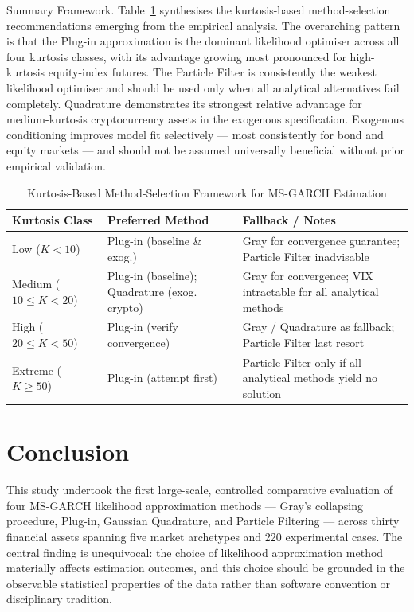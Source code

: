\documentclass[12pt, a4paper]{article}
\begin{document}
Summary Framework.
Table~\ref{tab:framework} synthesises the kurtosis-based method-selection recommendations emerging from the empirical analysis. The overarching pattern is that the Plug-in approximation is the dominant likelihood optimiser across all four kurtosis classes, with its advantage growing most pronounced for high-kurtosis equity-index futures. The Particle Filter is consistently the weakest likelihood optimiser and should be used only when all analytical alternatives fail completely. Quadrature demonstrates its strongest relative advantage for medium-kurtosis cryptocurrency assets in the exogenous specification. Exogenous conditioning improves model fit selectively — most consistently for bond and equity markets — and should not be assumed universally beneficial without prior empirical validation.

\begin{table}[ht]
\centering
\small
\caption{Kurtosis-Based Method-Selection Framework for MS-GARCH Estimation}
\label{tab:framework}
\begin{tabular}{p{2.2cm} p{2.8cm} p{2.8cm}}
\toprule
\textbf{Kurtosis Class} & \textbf{Preferred Method} & \textbf{Fallback / Notes} \\
\midrule
Low ($K < 10$) & Plug-in (baseline \& exog.) & Gray for convergence guarantee; Particle Filter inadvisable \\[4pt]
Medium ($10\!\le\! K < 20$) & Plug-in (baseline); Quadrature (exog. crypto) & Gray for convergence; VIX intractable for all analytical methods \\[4pt]
High ($20\!\le\! K < 50$) & Plug-in (verify convergence) & Gray / Quadrature as fallback; Particle Filter last resort \\[4pt]
Extreme ($K \ge 50$) & Plug-in (attempt first) & Particle Filter only if all analytical methods yield no solution \\
\bottomrule
\end{tabular}
\end{table}

\section{Conclusion}
\label{sec:conclusion}

This study undertook the first large-scale, controlled comparative evaluation of four MS-GARCH likelihood approximation methods — Gray's collapsing procedure, Plug-in, Gaussian Quadrature, and Particle Filtering — across thirty financial assets spanning five market archetypes and 220 experimental cases. The central finding is unequivocal: the choice of likelihood approximation method materially affects estimation outcomes, and this choice should be grounded in the observable statistical properties of the data rather than software convention or disciplinary tradition.
\end{document}
